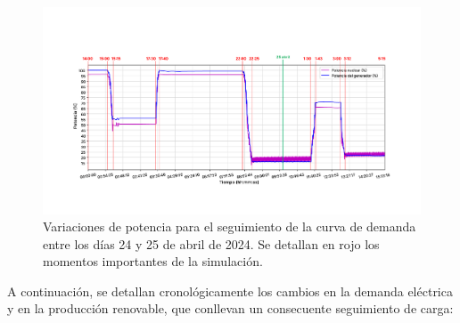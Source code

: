 \begin{figure}[!h]
  \centering
  \includegraphics[width=\textwidth]{content/figures/sim4_potencias_contextualizacion.pdf}
  \caption{Variaciones de potencia para el seguimiento de la curva de demanda entre los días 24 y 25 de abril de 2024. Se detallan en rojo los momentos importantes de la simulación.}
  \label{fig:sim4_potencias_contextualizacion}
\end{figure}

A continuación, se detallan cronológicamente los cambios en la demanda eléctrica y en la producción renovable, que conllevan un consecuente seguimiento de carga:

